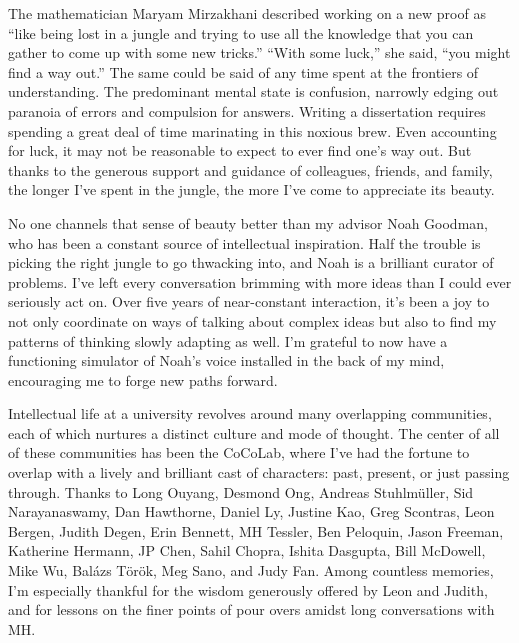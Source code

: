 
\doublespacing

The mathematician Maryam Mirzakhani described working on a new proof as ``like being lost in a jungle and trying to use all the knowledge that you can gather to come up with some new tricks.'' 
``With some luck,'' she said, ``you might find a way out.''
The same could be said of any time spent at the frontiers of understanding.
The predominant mental state is confusion, narrowly edging out paranoia of errors and compulsion for answers.
Writing a dissertation requires spending a great deal of time marinating in this noxious brew.
Even accounting for luck, it may not be reasonable to expect to ever find one's way out.
But thanks to the generous support and guidance of colleagues, friends, and family, the longer I've spent in the jungle, the more I've come to appreciate its beauty.

No one channels that sense of beauty better than my advisor Noah Goodman, who has been a constant source of intellectual inspiration.
Half the trouble is picking the right jungle to go thwacking into, and Noah is a brilliant curator of problems.
I've left every conversation brimming with more ideas than I could ever seriously act on.
Over five years of near-constant interaction, it's been a joy to not only coordinate on ways of talking about complex ideas but also to find my patterns of thinking slowly adapting as well.
I'm grateful to now have a functioning simulator of Noah's voice installed in the back of my mind, encouraging me to forge new paths forward.

Intellectual life at a university revolves around many overlapping communities, each of which nurtures a distinct culture and mode of thought.
The center of all of these communities has been the CoCoLab, where I've had the fortune to overlap with a lively and brilliant cast of characters: past, present, or just passing through. 
Thanks to Long Ouyang, Desmond Ong, Andreas Stuhlm\"uller, Sid Narayanaswamy, Dan Hawthorne, Daniel Ly, Justine Kao, Greg Scontras, Leon Bergen, Judith Degen, Erin Bennett, MH Tessler, Ben Peloquin, Jason Freeman, Katherine Hermann, JP Chen, Sahil Chopra, Ishita Dasgupta, Bill McDowell, Mike Wu, Bal\'azs T\"or\"ok, Meg Sano, and Judy Fan.
Among countless memories, I'm especially thankful for the wisdom generously offered by Leon and Judith, and for lessons on the finer points of pour overs amidst long conversations with MH. 

